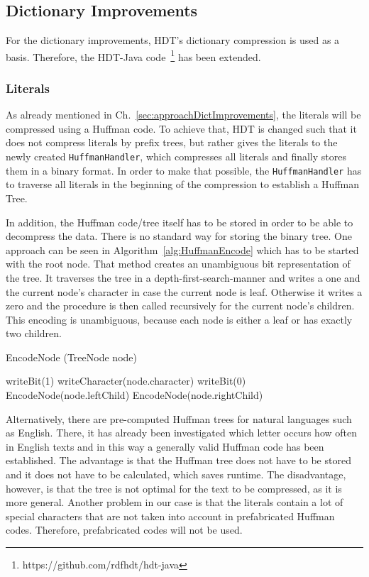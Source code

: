 \subsection{Dictionary Improvements}\label{sec:implementationDictImprovements}

For the dictionary improvements, HDT's dictionary compression is used as a basis. Therefore, the HDT-Java code~\footnote{https://github.com/rdfhdt/hdt-java} has been extended.

\subsubsection{Literals}\label{sec:implementationLiterals}

As already mentioned in Ch.~\ref{sec:approachDictImprovements}, the literals will be compressed using a Huffman code. To achieve that, HDT is changed such that it does not compress literals by prefix trees, but rather gives the literals to the newly created {\tt HuffmanHandler}, which compresses all literals and finally stores them in a binary format. In order to make that possible, the {\tt HuffmanHandler} has to traverse all literals in the beginning of the compression to establish a Huffman Tree.

In addition, the Huffman code/tree itself has to be stored in order to be able to decompress the data. There is no standard way for storing the binary tree. One approach can be seen in Algorithm~\ref{alg:HuffmanEncode} which has to be started with the root node. That method creates an unambiguous bit representation of the tree. It traverses the tree in a depth-first-search-manner and writes a one and the current node's character in case the current node is leaf. Otherwise it writes a zero and the procedure is then called recursively for the current node's children. This encoding is unambiguous, because each node is either a leaf or has exactly two children.

\begin{algorithm}
	\caption{EncodeNode (TreeNode node)}\label{alg:HuffmanEncode}
	\begin{algorithmic}[1]
		\State writeBit(1)
		\State writeCharacter(node.character)
		\Else
		\State writeBit(0)
		\State EncodeNode(node.leftChild)
		\State EncodeNode(node.rightChild)
		\EndIf
	\end{algorithmic}
\end{algorithm}


Alternatively, there are pre-computed Huffman trees for natural languages such as English. There, it has already been investigated which letter occurs how often in English texts and in this way a generally valid Huffman code has been established. The advantage is that the Huffman tree does not have to be stored and it does not have to  be calculated, which saves runtime. The disadvantage, however, is that the tree is not optimal for the text to be compressed, as it is more general. Another problem in our case is that the literals contain a lot of special characters that are not taken into account in prefabricated Huffman codes. Therefore, prefabricated codes will not be used.

